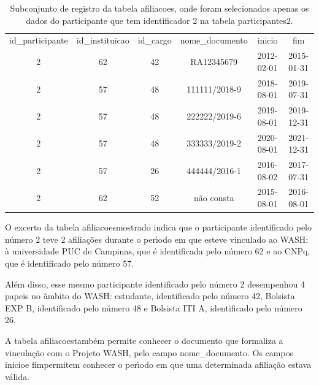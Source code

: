 \documentclass[
12pt,		%
openright,	%
twoside,  %
a4paper,			%
chapter=TITLE,		%
english,			%
french,				%
spanish,			%
brazil				%
]{USPSC-classe/USPSC_RedarTex}
\begin{document}
\begin{table}[htb]
\tiny
\caption{\label{7b93d5d9eeecbaf5dce19992b7b5767e0e632a41}Subconjunto de registro da tabela afiliacoes, onde foram selecionados apenas os dados do participante que tem identificador 2 na tabela participantes2.}

\centering
\begin{tabular}{|c|c|c|c|c|c|}
\hline
id\_participante  &  id\_instituicao  &  id\_cargo  &  nome\_documento  &  inicio      &  fim \\
              2  &              62  &        42  &  RA12345679      &  2012-02-01  &  2015-01-31  \\
              2  &              57  &        48  &  111111/2018-9   &  2018-08-01  &  2019-07-31  \\
              2  &              57  &        48  &  222222/2019-6   &  2019-08-01  &  2019-12-31  \\
              2  &              57  &        48  &  333333/2019-2   &  2020-08-01  &  2021-12-31  \\
              2  &              57  &        26  &  444444/2016-1   &  2016-08-02  &  2017-07-31  \\
              2  &              62  &        52  &  n\~ao consta      &  2015-08-01  &  2016-08-01 \\
\hline
\end{tabular}
\end{table}


O excerto da tabela \textquotedbl afiliacoes\textquotedbl  mostrado indica que o participante identificado pelo n\'umero 2 teve 2 afilia\c{c}\~oes durante o per\'{\i}odo em que esteve vinculado ao WASH: \`a universidade PUC de Campinas, que \'e identificada pelo n\'umero 62 e ao CNPq, que \'e identificado pelo n\'umero 57.










Al\'em disso, esse mesmo participante identificado pelo n\'umero 2 desempenhou 4 papeis no \^ambito do WASH: estudante, identificado pelo n\'umero 42, Bolsista EXP B, identificado pelo n\'umero 48 e Bolsista ITI A, identificado pelo n\'umero 26.










A tabela \textquotedbl afiliacoes\textquotedbl  tamb\'em permite conhecer o documento que formaliza a vincula\c{c}\~ao com o Projeto WASH, pelo campo nome\_documento. Os campos \textquotedbl inicio\textquotedbl  e \textquotedbl fim\textquotedbl  permitem conhecer o per\'{\i}odo em que uma determinada afilia\c{c}\~ao estava v\'alida.
\end{document}
